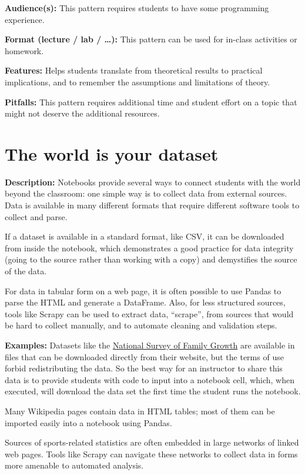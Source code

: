\documentclass[]{book}
\begin{document}
\textbf{Audience(s):}
This pattern requires students to have some programming experience.

\textbf{Format (lecture / lab / \ldots):}
This pattern can be used for in-class activities or homework.

\textbf{Features:}
Helps students translate from theoretical results to practical implications,
and to remember the assumptions and limitations of theory.

\textbf{Pitfalls:}
This pattern requires additional time and student effort on a topic that might
not deserve the additional resources.

\hypertarget{the-world-is-your-dataset}{%
\section{The world is your dataset}\label{the-world-is-your-dataset}}

\textbf{Description:}
Notebooks provide several ways to connect students with the world beyond the classroom:
one simple way is to collect data from external sources. Data is available in many
different formats that require different software tools to collect and parse.

If a dataset is available in a standard format, like CSV, it can be downloaded from
inside the notebook, which demonstrates a good practice for data integrity (going to
the source rather than working with a copy) and demystifies the source of the data.

For data in tabular form on a web page, it is often possible to use Pandas to
parse the HTML and generate a DataFrame. Also, for less structured sources,
tools like Scrapy can be used to extract data, ``scrape'', from sources that
would be hard to collect manually, and to automate cleaning and validation
steps.

\textbf{Examples:}
Datasets like the \href{https://www.cdc.gov/nchs/nsfg/index.htm}{National Survey of Family Growth} are available
in files that can be downloaded directly from their website, but the terms of
use forbid redistributing the data. So the best way for an instructor to share
this data is to provide students with code to input into a notebook cell,
which, when executed, will download the data set the first time the student
runs the notebook.

Many Wikipedia pages contain data in HTML tables; most of them can be imported
easily into a notebook using Pandas.

Sources of sports-related statistics are often embedded in large networks of
linked web pages. Tools like Scrapy can navigate these networks to collect data
in forms more amenable to automated analysis.
\end{document}
